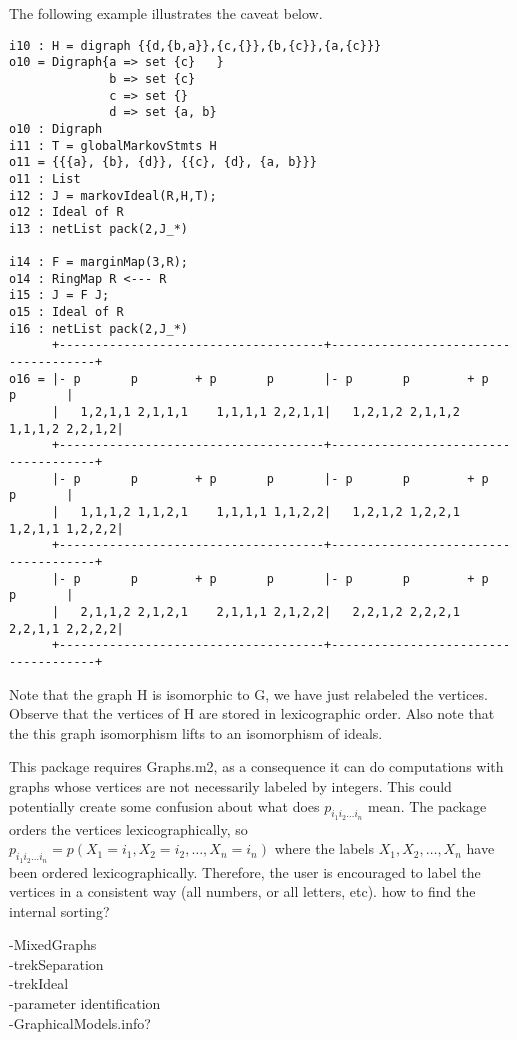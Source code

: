 \documentclass[10pt]{article}
\theoremstyle{definition}
\begin{document}
The following example illustrates the caveat below.
\begin{verbatim}
i10 : H = digraph {{d,{b,a}},{c,{}},{b,{c}},{a,{c}}}
o10 = Digraph{a => set {c}   }
              b => set {c}
              c => set {}
              d => set {a, b}
o10 : Digraph
i11 : T = globalMarkovStmts H
o11 = {{{a}, {b}, {d}}, {{c}, {d}, {a, b}}}
o11 : List
i12 : J = markovIdeal(R,H,T);
o12 : Ideal of R
i13 : netList pack(2,J_*)

i14 : F = marginMap(3,R);
o14 : RingMap R <--- R
i15 : J = F J;
o15 : Ideal of R
i16 : netList pack(2,J_*)
      +-------------------------------------+-------------------------------------+
o16 = |- p       p        + p       p       |- p       p        + p       p       |
      |   1,2,1,1 2,1,1,1    1,1,1,1 2,2,1,1|   1,2,1,2 2,1,1,2    1,1,1,2 2,2,1,2|
      +-------------------------------------+-------------------------------------+
      |- p       p        + p       p       |- p       p        + p       p       |
      |   1,1,1,2 1,1,2,1    1,1,1,1 1,1,2,2|   1,2,1,2 1,2,2,1    1,2,1,1 1,2,2,2|
      +-------------------------------------+-------------------------------------+
      |- p       p        + p       p       |- p       p        + p       p       |
      |   2,1,1,2 2,1,2,1    2,1,1,1 2,1,2,2|   2,2,1,2 2,2,2,1    2,2,1,1 2,2,2,2|
      +-------------------------------------+-------------------------------------+
\end{verbatim}

Note that the graph H is isomorphic to G, we have just relabeled the vertices. Observe that the vertices of H are stored in lexicographic order. Also note that the this graph isomorphism lifts to an isomorphism of ideals.
 
This package requires Graphs.m2, as a consequence it can do
computations with graphs whose vertices are not necessarily labeled by
integers. This could potentially create some confusion about what does
$p_{i_1i_2\ldots i_n}$  mean. The package orders the vertices lexicographically, so
$p_{i_1i_2\ldots i_n}  = p(X_1 = i_1, X_2 = i_2, \ldots, X_n  = i_n)$ where the labels
$X_1,X_2,\ldots,X_n$  have been ordered lexicographically. Therefore, the user
is encouraged to label the vertices in a consistent way (all numbers,
or all letters, etc). how to find the internal sorting?

-MixedGraphs \\
-trekSeparation \\
-trekIdeal \\
-parameter identification \\
-GraphicalModels.info? \\
\end{document}
